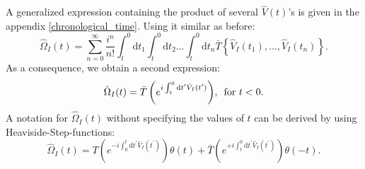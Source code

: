 \documentclass[12pt, titlepage]{article}
\begin{document}
A generalized expression containing the product of several $ \hat{V}(t) $'s is given in the appendix \ref{chronological_time}.
Using it similar as before:
\begin{equation}
\hat{\Omega}_{I}(t) =
\sum\limits_{n=0}^{\infty} 
\frac{i^{n}}{n!}
\int^{0}_{t}\mathrm{d}t_1\int^{0}_{t}\! \! \mathrm{d}t_2
 \ldots
 \int^{0}_{t}\! \! \mathrm{d}t_n
 \bar{T}\left\lbrace \hat{V}_{I}(t_1), \ldots , \hat{V}_{I}(t_n)\right\rbrace .
\end{equation}
As a consequence, we obtain a second expression:\begin{equation}\label{eq:Omega_I_Chron1_0<}
\hat{\Omega}_{I}(t)
= \bar{T}\left( e^{i\int^{0}_{t}\mathrm{d}t^{\prime} \hat{V}_{I}(t^{\prime})} \right)
	\! ,\text{\enskip for  }  t<0 
	.
\end{equation}
A notation for $ \hat{\Omega}_{I}(t) $ without specifying the values of $ t $ can be derived by using Heaviside-Step-functions:
\begin{equation}\label{Omega_i_complete}
\hat{\Omega}_{I}(t)
=T\left( e^{-i\int_{0}^{t}\mathrm{d}t^{\prime} \hat{V}_{I}(t^{\prime})} \right)
\theta(t)
+
 \bar{T}\left( e^{+i\int_{t}^{0}\mathrm{d}t^{\prime} \hat{V}_{I}(t^{\prime})} \right)
 \theta(-t)
 .
\end{equation}
\end{document}
